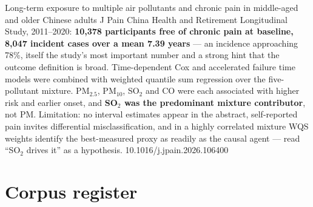 \documentclass[10pt]{article}
\begin{document}
{Long-term exposure to multiple air pollutants and chronic pain in middle-aged and older
Chinese adults}
{J Pain}
{China Health and Retirement Longitudinal Study, 2011--2020: \textbf{10{,}378
participants free of chronic pain at baseline, 8{,}047 incident cases over a mean 7.39
years} --- an incidence approaching 78\%, itself the study's most important number and a
strong hint that the outcome definition is broad. Time-dependent Cox and accelerated
failure time models were combined with weighted quantile sum regression over the
five-pollutant mixture. PM$_{2.5}$, PM$_{10}$, SO$_2$ and CO were each associated with
higher risk and earlier onset, and \textbf{SO$_2$ was the predominant mixture
contributor}, not PM. Limitation: no interval estimates appear in the abstract,
self-reported pain invites differential misclassification, and in a highly correlated
mixture WQS weights identify the best-measured proxy as readily as the causal agent ---
read ``SO$_2$ drives it'' as a hypothesis.}
{10.1016/j.jpain.2026.106400}

\clearpage

\section*{\sffamily\bfseries\color{Deep}Corpus register}
\vspace{-1.5mm}{\color{Amber}\rule{\linewidth}{1.1pt}}\vspace{2.5mm}


\end{document}
